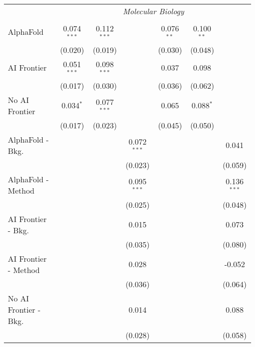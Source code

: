 \begin{tabular}{lcccccc}
 & \multicolumn{6}{c}{\textit{Molecular Biology}} \\ \\
   AlphaFold               & 0.074$^{***}$ & 0.112$^{***}$ &               & 0.076$^{**}$ & 0.100$^{**}$ &   \\   
                           & (0.020)       & (0.019)       &               & (0.030)      & (0.048)      &   \\   
   AI Frontier             & 0.051$^{***}$ & 0.098$^{***}$ &               & 0.037        & 0.098        &   \\   
                           & (0.017)       & (0.030)       &               & (0.036)      & (0.062)      &   \\   
   No AI Frontier          & 0.034$^{*}$   & 0.077$^{***}$ &               & 0.065        & 0.088$^{*}$  &   \\   
                           & (0.017)       & (0.023)       &               & (0.045)      & (0.050)      &   \\   
   AlphaFold - Bkg.        &               &               & 0.072$^{***}$ &              &              & 0.041\\   
                           &               &               & (0.023)       &              &              & (0.059)\\   
   AlphaFold - Method      &               &               & 0.095$^{***}$ &              &              & 0.136$^{***}$\\   
                           &               &               & (0.025)       &              &              & (0.048)\\   
   AI Frontier - Bkg.      &               &               & 0.015         &              &              & 0.073\\   
                           &               &               & (0.035)       &              &              & (0.080)\\   
   AI Frontier - Method    &               &               & 0.028         &              &              & -0.052\\   
                           &               &               & (0.036)       &              &              & (0.064)\\   
   No AI Frontier - Bkg.   &               &               & 0.014         &              &              & 0.088\\   
                           &               &               & (0.028)       &              &              & (0.058)\\   

\end{tabular}
